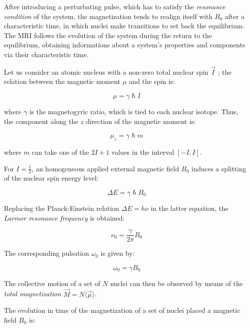 \documentclass[12pt,openright,twoside,a4paper]{book}
\begin{document}
After introducing a perturbating pulse, which has to satisfy the \textit{resonance condition} of the system, the magnetization tends to realign itself with $B_0$ after a characteristic time, in which nuclei make transitions to set back the equilibrium.
The MRI follows the evolution of the system during the return to the equilibrium, obtaining informations about a system's properties and components via their characteristic time.

Let us consider an atomic nucleus with a non-zero total nuclear spin $\overrightarrow{I}$ ; the relation between the magnetic moment $\mu$ and the spin is:

\begin{equation}
\mu =\gamma  \hslash I
\end{equation}

where $\gamma$ is the magnetogyric ratio, which is tied to each nuclear isotope. Thus, the component along the $z$ direction of the magnetic moment is:

\begin{equation}
\mu_z =\gamma  \hslash m
\end{equation}

where $m$ can take one of the $2I+1$ values in the interval $[-I, I]$.

For $I=\frac{1}{2}$, an homogeneous applied external magnetic  field $B_0$ induces a splitting of the nuclear spin energy level:

\begin{equation}
\Delta E=\gamma  \hslash B_0
\end{equation}


Replacing the Planck-Einstein relation $\Delta E=h \nu$ in the latter equation, the \textit{Larmor resonance frequency} is obtained:

\begin{equation}
\nu_0=\frac{\gamma}{2\pi}B_0
\end{equation}

The corresponding pulsation $\omega_0$ is given by:

\begin{equation}
\omega_0=\gamma B_0
\end{equation}
\vspace{5mm}

The collective motion of a set of $N$ nuclei can then be observed by means of the \textit{total magnetization} $\overrightarrow{M}=N\langle \overrightarrow{\mu}\rangle$.

The evolution in time of the magnetization  of a set of nuclei placed a magnetic  field $B_0$ is:
\end{document}
